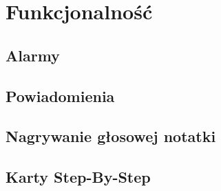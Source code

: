 \section{Funkcjonalność}

\subsection{Alarmy}

\subsection{Powiadomienia}

\subsection{Nagrywanie głosowej notatki}
\label{sec:glosowaNotatka}

\subsection{Karty Step-By-Step}

